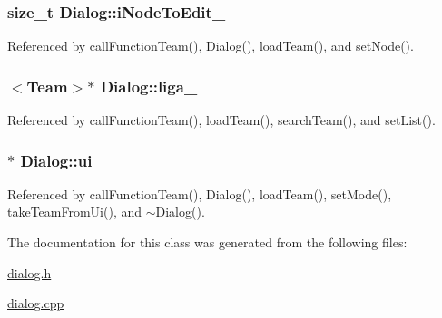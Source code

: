 \subsubsection[{i\+Node\+To\+Edit\+\_\+}]{\setlength{\rightskip}{0pt plus 5cm}size\+\_\+t Dialog\+::i\+Node\+To\+Edit\+\_\+\hspace{0.3cm}{\ttfamily [private]}}\label{class_dialog_a77bd4ac2499af67029f8f00d682ffde9}


Referenced by call\+Function\+Team(), Dialog(), load\+Team(), and set\+Node().

\hypertarget{class_dialog_a91cdee063ecd915858353d07f2e50eb2}{}
\subsubsection[{liga\+\_\+}]{$<${\bf Team}$>$$\ast$ Dialog\+::liga\+\_\+\hspace{0.3cm}{\ttfamily [private]}}\label{class_dialog_a91cdee063ecd915858353d07f2e50eb2}


Referenced by call\+Function\+Team(), load\+Team(), search\+Team(), and set\+List().

\hypertarget{class_dialog_aaa4b5bfb9a0f64900d524f14bc32e6df}{}
\subsubsection[{ui}]{$\ast$ Dialog\+::ui\hspace{0.3cm}{\ttfamily [private]}}\label{class_dialog_aaa4b5bfb9a0f64900d524f14bc32e6df}


Referenced by call\+Function\+Team(), Dialog(), load\+Team(), set\+Mode(), take\+Team\+From\+Ui(), and $\sim$\+Dialog().



The documentation for this class was generated from the following files\+:\begin{DoxyCompactItemize}
\item 
\hyperlink{dialog_8h}{dialog.\+h}\item 
\hyperlink{dialog_8cpp}{dialog.\+cpp}\end{DoxyCompactItemize}
